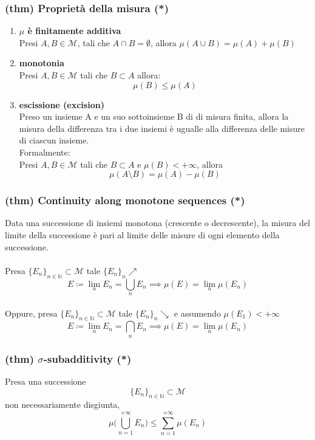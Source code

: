 \subsubsection{(thm) Proprietà della misura (*)}
\begin{enumerate}[label=(\roman*)]
    \item \textbf{$\mu$ è finitamente additiva} \\ 
    Presi $A,B \in \mathcal M$, tali che $A\cap B=\emptyset$, allora $\mu(A\cup B)=\mu(A)+\mu(B)$
    \item \textbf{monotonia}\\
    Presi $A,B \in \mathcal M$ tali che $B\subset A$ allora:
    $$\mu(B)\leq\mu(A)$$
    \item \textbf{escissione (excision)} \\ Preso un insieme A e un suo sottoinsieme B di di misura finita, allora la misura della differenza tra i due insiemi è ugualle alla differenza delle misure di ciascun insieme.\\
    Formalmente:\\
    Presi $A,B\in \mathcal M$ tali che $B\subset A$ e $\mu(B)<+\infty$, allora $$\mu(A\setminus B)=\mu(A)-\mu(B)$$
\end{enumerate}

\subsubsection{(thm) Continuity along monotone sequences (*)}
Data una successione di insiemi monotona (crescente o decrescente), la misura del limite della successione è pari al limite delle misure di ogni elemento della successione. \\ \\
Presa $\{ E_n\}_{n\in \mathbb N}\subset \mathcal M$ tale $\{E_n\}_n \nearrow$ $$E\coloneq \lim_n E_n =\bigcup_n E_n\implies \mu(E)=\lim_n\mu (E_n)$$ 
\\
Oppure, presa $\{ E_n\}_{n\in \mathbb N}\subset \mathcal M$ tale $\{E_n\}_n \searrow$ e assumendo $\mu(E_1)<+\infty$ $$E\coloneq \lim_n E_n =\bigcap_n E_n\implies \mu(E)=\lim_n\mu (E_n)$$ 

\subsubsection{(thm) $\sigma$-subadditivity (*)}
Presa una successione
$$\{E_n\}_{n\in\mathbb N}\subset \mathcal M$$
non necessariamente disgiunta,
$$\mu\Big (\bigcup_{n=1}^{+\infty} E_n\Big )\le \sum_{n=1}^{+\infty}\mu(E_n)$$

